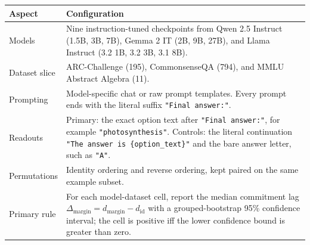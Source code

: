 \begin{tabularx}{\linewidth}{@{}lX@{}}
\toprule
\textbf{Aspect} & \textbf{Configuration}\\
\midrule
Models & Nine instruction-tuned checkpoints from Qwen 2.5 Instruct (1.5B, 3B, 7B), Gemma 2 IT (2B, 9B, 27B), and Llama Instruct (3.2 1B, 3.2 3B, 3.1 8B). \\
Dataset slice & ARC-Challenge (195), CommonsenseQA (794), and MMLU Abstract Algebra (11). \\
Prompting & Model-specific chat or raw prompt templates. Every prompt ends with the literal suffix \texttt{"Final answer:"}. \\
Readouts & Primary: the exact option text after \texttt{"Final answer:"}, for example \texttt{"photosynthesis"}. Controls: the literal continuation \texttt{"The answer is \{option\_text\}"} and the bare answer letter, such as \texttt{"A"}. \\
Permutations & Identity ordering and reverse ordering, kept paired on the same example subset. \\
Primary rule & For each model-dataset cell, report the median commitment lag $\Delta_{\mathrm{margin}} = d_{\mathrm{margin}} - d_{\mathrm{id}}$ with a grouped-bootstrap 95\% confidence interval; the cell is positive iff the lower confidence bound is greater than zero. \\
\bottomrule
\end{tabularx}
